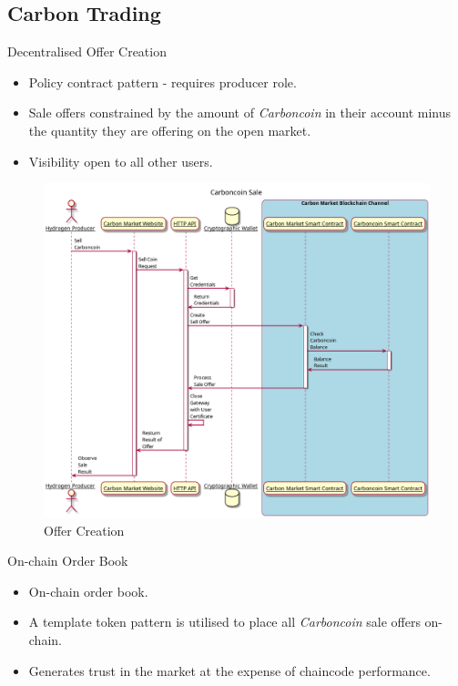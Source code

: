 \subsection{Carbon Trading}
\begin{frame}{Decentralised Offer Creation}
    \begin{itemize}
        \item Policy contract pattern - requires producer role.
        \item Sale offers constrained by the amount of \textit{Carboncoin}
              in their account minus the quantity they are offering on the open
              market.
        \item Visibility open to all other users.
    \end{itemize}
    \begin{figure}
        \caption{Offer Creation}
        \centering
        \includegraphics[height=0.4\textheight, width=0.5\linewidth]
        {figures/CreateSale.png}
    \end{figure}
\end{frame}
\begin{frame}{On-chain Order Book}
    \begin{itemize}
        \item On-chain order book.
        \item A template token pattern is utilised to place all
              \textit{Carboncoin} sale offers on-chain.
        \item Generates trust in the market at the expense of chaincode
              performance.
    \end{itemize}
\end{frame}
